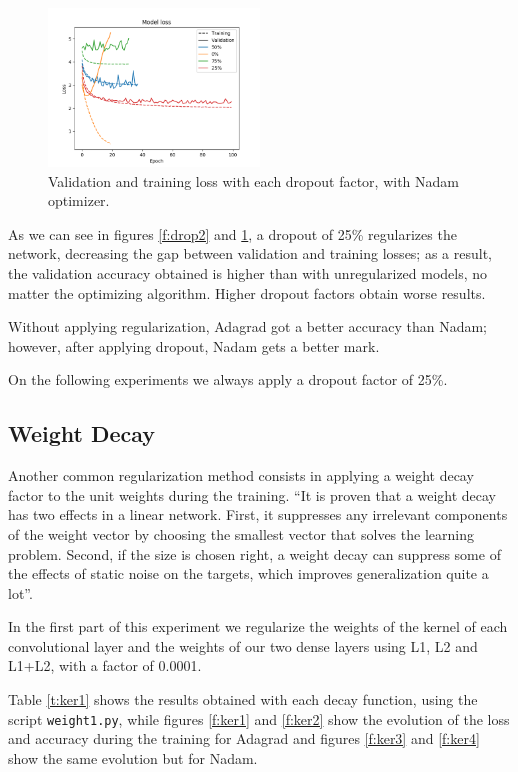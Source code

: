 \documentclass[]{article}
\begin{document}
\begin{figure}[H]
	\centering
	\includegraphics[width=0.5\textwidth]{dropout_nadam_loss}
	\caption{Validation and training loss with each dropout factor, with Nadam optimizer.}
	\label{f:drop3}
\end{figure}

As we can see in figures \ref{f:drop2} and \ref{f:drop3}, a dropout of 25\% regularizes the network, decreasing the gap between validation and training losses; as a result, the validation accuracy obtained is higher than with unregularized models, no matter the optimizing algorithm. Higher dropout factors obtain worse results.

Without applying regularization, Adagrad got a better accuracy than Nadam; however, after applying dropout, Nadam gets a better mark.

On the following experiments we always apply a dropout factor of 25\%.

\subsection{Weight Decay}

Another common regularization method consists in applying a weight decay factor to the unit weights during the training. \cite{krogh1992simple} ``It is proven that a weight decay has two effects in a linear network. First, it suppresses any irrelevant components of the weight vector by choosing the smallest vector that solves the learning problem. Second, if the size is chosen right, a weight decay can suppress some of the effects of static noise on the targets, which improves generalization quite a lot''.

In the first part of this experiment we regularize the weights of the kernel of each convolutional layer and the weights of our two dense layers using L1, L2 and L1+L2, with a factor of 0.0001.

Table \ref{t:ker1} shows the results obtained with each decay function, using the script \texttt{weight1.py}, while figures \ref{f:ker1} and \ref{f:ker2} show the evolution of the loss and accuracy during the training for Adagrad and figures \ref{f:ker3} and \ref{f:ker4} show the same evolution but for Nadam.
\end{document}
